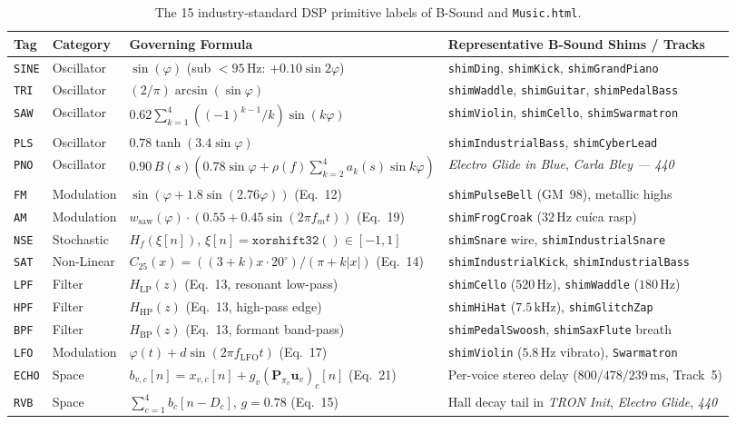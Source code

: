 \begin{table}[htbp]
\centering
\caption{The 15 industry-standard DSP primitive labels of B-Sound and \texttt{Music.html}.}
\label{tab:dsp-labels}
\scriptsize
\begin{tabular}{@{}llll@{}}
\toprule
Tag & Category & Governing Formula & Representative B-Sound Shims / Tracks \\
\midrule
\texttt{SINE} & Oscillator & $\sin(\varphi)$ (sub $<95\,\text{Hz}$: $+0.10\sin 2\varphi$) & \texttt{shimDing}, \texttt{shimKick}, \texttt{shimGrandPiano} \\
\texttt{TRI} & Oscillator & $(2/\pi)\arcsin(\sin\varphi)$ & \texttt{shimWaddle}, \texttt{shimGuitar}, \texttt{shimPedalBass} \\
\texttt{SAW} & Oscillator & $0.62\sum_{k=1}^{4}((-1)^{k-1}/k)\sin(k\varphi)$ & \texttt{shimViolin}, \texttt{shimCello}, \texttt{shimSwarmatron} \\
\texttt{PLS} & Oscillator & $0.78\tanh(3.4\sin\varphi)$ & \texttt{shimIndustrialBass}, \texttt{shimCyberLead} \\
\texttt{PNO} & Oscillator & $0.90\,B(s)(0.78\sin\varphi + \rho(f)\sum_{k=2}^{4}a_k(s)\sin k\varphi)$ & \emph{Electro Glide in Blue}, \emph{Carla Bley — 440} \\
\texttt{FM} & Modulation & $\sin(\varphi + 1.8\sin(2.76\varphi))$ (Eq.~12) & \texttt{shimPulseBell} (GM~98), metallic highs \\
\texttt{AM} & Modulation & $w_{\mathrm{saw}}(\varphi)\cdot(0.55 + 0.45\sin(2\pi f_m t))$ (Eq.~19) & \texttt{shimFrogCroak} ($32\,\text{Hz}$ cu\'ica rasp) \\
\texttt{NSE} & Stochastic & $H_f(\xi[n])$, $\xi[n] = \texttt{xorshift32}() \in [-1,1]$ & \texttt{shimSnare} wire, \texttt{shimIndustrialSnare} \\
\texttt{SAT} & Non-Linear & $C_{25}(x) = ((3+k)x\cdot 20^\circ)/(\pi + k|x|)$ (Eq.~14) & \texttt{shimIndustrialKick}, \texttt{shimIndustrialBass} \\
\texttt{LPF} & Filter & $H_{\mathrm{LP}}(z)$ (Eq.~13, resonant low-pass) & \texttt{shimCello} ($520\,\text{Hz}$), \texttt{shimWaddle} ($180\,\text{Hz}$) \\
\texttt{HPF} & Filter & $H_{\mathrm{HP}}(z)$ (Eq.~13, high-pass edge) & \texttt{shimHiHat} ($7.5\,\text{kHz}$), \texttt{shimGlitchZap} \\
\texttt{BPF} & Filter & $H_{\mathrm{BP}}(z)$ (Eq.~13, formant band-pass) & \texttt{shimPedalSwoosh}, \texttt{shimSaxFlute} breath \\
\texttt{LFO} & Modulation & $\varphi(t) + d\sin(2\pi f_{\mathrm{LFO}} t)$ (Eq.~17) & \texttt{shimViolin} ($5.8\,\text{Hz}$ vibrato), \texttt{Swarmatron} \\
\texttt{ECHO} & Space & $b_{v,c}[n] = x_{v,c}[n] + g_v(\mathbf{P}_{\pi_v}\mathbf{u}_v)_c[n]$ (Eq.~21) & Per-voice stereo delay ($800/478/239\,\text{ms}$, Track~5) \\
\texttt{RVB} & Space & $\sum_{c=1}^{4} b_c[n - D_c]$, $g = 0.78$ (Eq.~15) & Hall decay tail in \emph{TRON Init}, \emph{Electro Glide}, \emph{440} \\
\bottomrule
\end{tabular}
\end{table}

